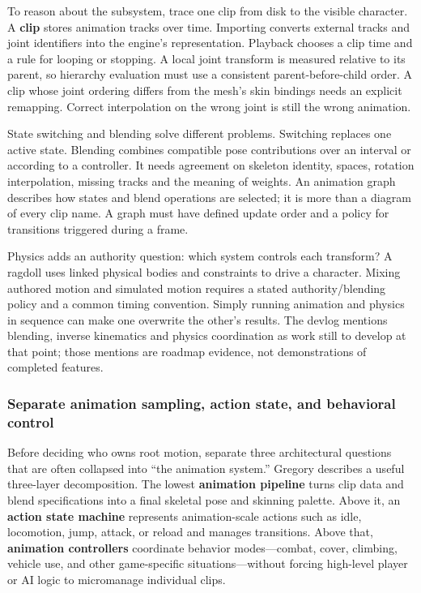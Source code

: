 To reason about the subsystem, trace one clip from disk to the visible character. A \textbf{clip} stores animation tracks over time. Importing converts external tracks and joint identifiers into the engine's representation. Playback chooses a clip time and a rule for looping or stopping. A local joint transform is measured relative to its parent, so hierarchy evaluation must use a consistent parent-before-child order. A clip whose joint ordering differs from the mesh's skin bindings needs an explicit remapping. Correct interpolation on the wrong joint is still the wrong animation.

State switching and blending solve different problems. Switching replaces one active state. Blending combines compatible pose contributions over an interval or according to a controller. It needs agreement on skeleton identity, spaces, rotation interpolation, missing tracks and the meaning of weights. An animation graph describes how states and blend operations are selected; it is more than a diagram of every clip name. A graph must have defined update order and a policy for transitions triggered during a frame.

Physics adds an authority question: which system controls each transform? A ragdoll uses linked physical bodies and constraints to drive a character. Mixing authored motion and simulated motion requires a stated authority/blending policy and a common timing convention. Simply running animation and physics in sequence can make one overwrite the other's results. The devlog mentions blending, inverse kinematics and physics coordination as work still to develop at that point; those mentions are roadmap evidence, not demonstrations of completed features.

\subsubsection{Separate animation sampling, action state, and behavioral control}\label{06-engine-ii-ch040-separate-animation-sampling-action-state-and-behavioral-control}

Before deciding who owns root motion, separate three architectural questions that are often collapsed into ``the animation system.'' Gregory describes a useful three-layer decomposition. The lowest \textbf{animation pipeline} turns clip data and blend specifications into a final skeletal pose and skinning palette. Above it, an \textbf{action state machine} represents animation-scale actions such as idle, locomotion, jump, attack, or reload and manages transitions. Above that, \textbf{animation controllers} coordinate behavior modes---combat, cover, climbing, vehicle use, and other game-specific situations---without forcing high-level player or AI logic to micromanage individual clips.

